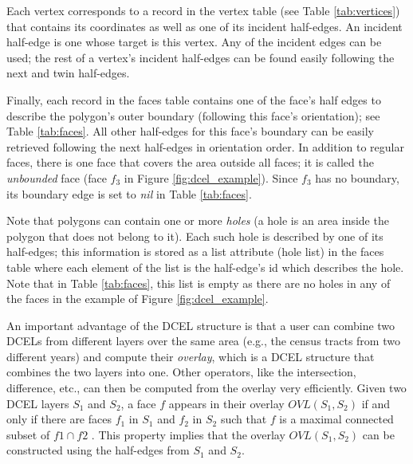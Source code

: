 
Each vertex corresponds to a record in the vertex table (see Table \ref{tab:vertices}) that contains its coordinates as well as one of its incident half-edges. An incident half-edge is one whose target is this vertex. Any of the incident edges can be used; the rest of a vertex's incident half-edges can be found easily following the next and twin half-edges.

Finally, each record in the faces table contains one of the face's half edges to describe the polygon's outer boundary (following this face's orientation); see Table \ref{tab:faces}. All other half-edges for this face's boundary can be easily retrieved following the next half-edges in orientation order. In addition to regular faces, there is one face that covers the area outside all faces; it is called the  \textit{unbounded} face (face $f_3$ in Figure \ref{fig:dcel_example}). Since $f_3$ has no boundary, its boundary edge is set to \textit{nil} in Table \ref{tab:faces}.

Note that polygons can contain one or more \textit{holes} (a hole is an area inside the polygon that does not belong to it). Each such hole is described by one of its half-edges; this information is stored as a list attribute (hole list) in the faces table where each element of the list is the half-edge's id which describes the hole. Note that in Table \ref{tab:faces}, this list is empty as there are no holes in any of the faces in the example of Figure \ref{fig:dcel_example}. 

An important advantage of the DCEL structure is that a user can combine two DCELs from different layers over the same area (e.g., the census tracts from two different years) and compute their \textit{overlay}, which is a DCEL structure that combines the two layers into one. Other operators, like the intersection, difference, etc., can then be computed from the overlay very efficiently. Given two DCEL layers $S_1$ and $S_2$, a face $f$ appears in their overlay  $OVL(S_1, S_2)$ if and only if there are faces $f_1$ in $S_1$ and $f_2$ in $S_2$ such that $f$ is a maximal connected subset of $f1 \cap f2$ \cite{berg_computational_2008}. This property implies that the overlay $OVL(S_1, S_2)$ can be constructed using the half-edges from $S_1$ and $S_2$. 


